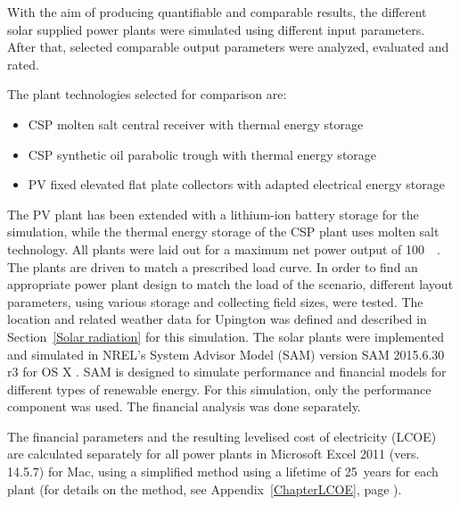 With the aim of producing quantifiable and comparable results, the different solar supplied power plants were simulated using different input parameters. After that, selected comparable output parameters were analyzed, evaluated and rated.

The plant technologies selected for comparison are:
\begin{itemize}
\item CSP molten salt central receiver with thermal energy storage
\item CSP synthetic oil parabolic trough with thermal energy storage
\item PV fixed elevated flat plate collectors with adapted electrical energy storage
\end{itemize}
The PV plant has been extended with a lithium-ion battery storage for the simulation, while the thermal energy storage of the CSP plant uses molten salt technology. All plants were laid out for a maximum net power output of \SI{100}{\mega\wattel}. The plants are driven to match a prescribed load curve. In order to find an appropriate power plant design to match the load of the scenario, different layout parameters, using various storage and collecting field sizes, were tested. The location and related weather data for Upington was defined and described in Section~\ref{Solar radiation} for this simulation. The solar plants were implemented and simulated in NREL’s System Advisor Model (SAM) version SAM 2015.6.30 r3 for OS X \cite{NREL2015}. SAM is designed to simulate performance and financial models for different types of renewable energy. For this simulation, only the performance component was used. The financial analysis was done separately. 

The financial parameters and the resulting levelised cost of electricity (LCOE) are calculated separately for all power plants in Microsoft Excel 2011 (vers. 14.5.7) for Mac, using a simplified method using a lifetime of \SI{25}{years} for each plant (for details on the method, see Appendix~\ref{ChapterLCOE}, page \pageref{ChapterLCOE}).